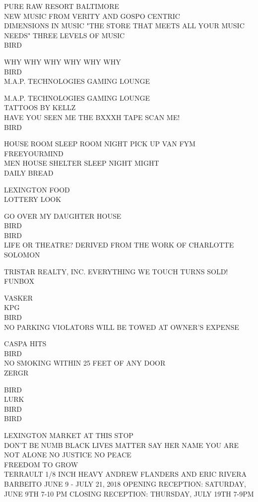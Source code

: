 \documentclass[10pt,letterpaper]{article}
\begin{document}
PURE RAW RESORT BALTIMORE\\
NEW MUSIC FROM VERITY AND GOSPO CENTRIC\\
DIMENSIONS IN MUSIC "THE STORE THAT MEETS ALL YOUR MUSIC NEEDS" THREE LEVELS OF MUSIC\\
BIRD

WHY WHY WHY WHY WHY WHY\\
BIRD\\
M.A.P. TECHNOLOGIES GAMING LOUNGE

M.A.P. TECHNOLOGIES GAMING LOUNGE\\
TATTOOS BY KELLZ\\
HAVE YOU SEEN ME THE BXXXH TAPE SCAN ME!\\
BIRD

HOUSE ROOM SLEEP ROOM NIGHT PICK UP VAN FYM FREEYOURMIND\\
MEN HOUSE SHELTER SLEEP NIGHT MIGHT\\
DAILY BREAD

LEXINGTON FOOD\\
LOTTERY LOOK

GO OVER MY DAUGHTER HOUSE\\
BIRD\\
BIRD\\
LIFE OR THEATRE? DERIVED FROM THE WORK OF CHARLOTTE SOLOMON

TRISTAR REALTY, INC. EVERYTHING WE TOUCH TURNS SOLD!\\
FUNBOX

VASKER\\
KPG\\
BIRD\\
NO PARKING VIOLATORS WILL BE TOWED AT OWNER'S EXPENSE

CASPA HITS\\
BIRD\\
NO SMOKING WITHIN 25 FEET OF ANY DOOR\\
ZERGR

BIRD\\
LURK\\
BIRD\\
BIRD

LEXINGTON MARKET AT THIS STOP\\
DON'T BE NUMB BLACK LIVES MATTER SAY HER NAME YOU ARE NOT ALONE NO JUSTICE NO PEACE\\
FREEDOM TO GROW\\
TERRAULT 1/8 INCH HEAVY ANDREW FLANDERS AND ERIC RIVERA BARBEITO JUNE 9 {-} JULY 21, 2018 OPENING RECEPTION: SATURDAY, JUNE 9TH 7{-}10 PM CLOSING RECEPTION: THURSDAY, JULY 19TH 7{-}9PM
\end{document}
